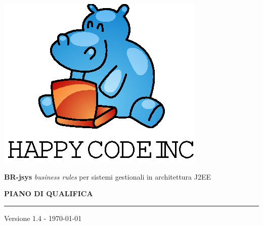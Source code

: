 \documentclass[11pt,titlepage,a4paper]{report}
\begin{document}
\newcommand{\lv}{1.4 } %
\newcommand{\PianoDiProgetto}{ PianoDiProgetto.1.0.pdf }
\newcommand{\Glossario}{ Glossario.1.4.pdf }



\begin{titlepage}
\begin{center}
\vspace*{0.5in}
\includegraphics{logo.eps}
\vspace*{0.2in}

{\Large \textbf{BR-jsys}}
{\Large \emph{business rules} per sistemi gestionali in architettura J2EE } 
\vspace{2in}

\LARGE \textbf {PIANO DI QUALIFICA}
\par\rule{10cm}{0.4pt} \par {\large Versione \lv - \today}


\end{center}
\end{titlepage}
\vspace*{0.5in}
\end{document}
